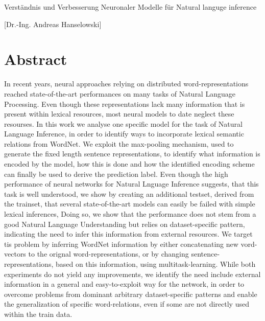 \documentclass[article,type=msc,11pt,colorback,accentcolor=tud9c]{tudthesis}
\begin{document}
    {Verständnis und Verbesserung Neuronaler Modelle für Natural languge inference}
  \author{Max Glockner}
  [Dr.-Ing. Andreas Hanselowski]
  \makethesistitle

\section*{Abstract}
\addtocounter{section}{0}
In recent years, neural approaches relying on distributed word-representations reached state-of-the-art performances on many tasks of Natural Language Processing. Even though these representations lack many information that is present within lexical resources, most neural models to date neglect these resourses. In this work we analyse one specific model for the task of Natural Language Inference, in order to identify ways to incorporate lexical semantic relations from WordNet. We exploit the max-pooling mechanism, used to generate the fixed length sentence representations, to identify what information is encoded by the model, how this is done and how the identified encoding scheme can finally be used to derive the prediction label. Even though the high performance of neural networks for Natural Lnguage Inference suggests, that this task is well understood, we show by creating an additional testset, derived from the trainset, that several state-of-the-art models can easily be failed with simple lexical inferences, Doing so, we show that the performance does not stem from a good Natural Language Understanding but relies on dataset-specific pattern, indicating the need to infer this information from external resources. We target tis problem by inferring WordNet information by either concatenating new vord-vectors to the orignal word-representations, or by changing sentence-representations, based on this information, using multitask-learning. While both experiments do not yield any improvements, we identify the need include external information in a general and easy-to-exploit way for the network, in order to overcome problems from dominant arbitrary dataset-specific patterns and enable the generalization of specific word-relations, even if some are not directly used within the train data.
\newpage\cleardoublepage
\end{document}

